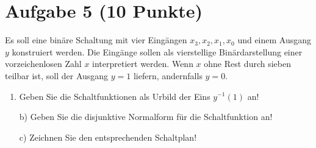 \section*{Aufgabe 5 (10 Punkte)}

Es soll eine binäre Schaltung mit vier Eingängen $x_3,x_2,x_1,x_0$ und einem Ausgang $y$ konstruiert werden. Die Eingänge sollen als vierstellige Binärdarstellung einer vorzeichenlosen Zahl $x$ interpretiert werden. Wenn $x$ ohne Rest durch sieben teilbar ist, soll der Ausgang $y = 1$ liefern, andernfalls $y = 0$.

\begin{enumerate}[label={a)}, leftmargin=*]
\item Geben Sie die Schaltfunktionen als Urbild der Eins $y^{-1}(1)$ an!
\item[b)] Geben Sie die disjunktive Normalform für die Schaltfunktion an!
\item[c)] Zeichnen Sie den entsprechenden Schaltplan!
\end{enumerate}